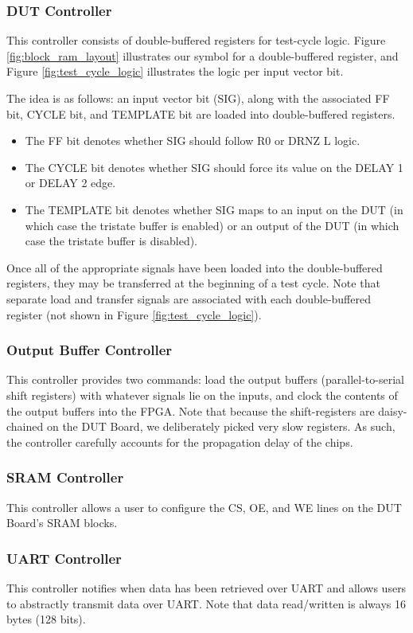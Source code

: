 \subsubsection{DUT Controller}
This controller consists of double-buffered registers for test-cycle logic. Figure \ref{fig:block_ram_layout} illustrates our symbol for a double-buffered register, and Figure \ref{fig:test_cycle_logic} illustrates the logic per input vector bit.

The idea is as follows: an input vector bit (SIG), along with the associated FF bit, CYCLE bit, and TEMPLATE bit are loaded into double-buffered registers. 
\begin{itemize}
\item The FF bit denotes whether SIG should follow R0 or DRNZ L logic.
\item The CYCLE bit denotes whether SIG should force its value on the DELAY 1 or DELAY 2 edge. 
\item The TEMPLATE bit denotes whether SIG maps to an input on the DUT (in which case the tristate buffer is enabled) or an output of the DUT (in which case the tristate buffer is disabled).
\end{itemize}

Once all of the appropriate signals have been loaded into the double-buffered registers, they may be transferred at the beginning of a test cycle. Note that separate load and transfer signals are associated with each double-buffered register (not shown in Figure \ref{fig:test_cycle_logic}). 

\subsubsection{Output Buffer Controller}
This controller provides two commands: load the output buffers (parallel-to-serial shift registers) with whatever signals lie on the inputs, and clock the contents of the output buffers into the FPGA. Note that because the shift-registers are daisy-chained on the DUT Board, we deliberately picked very slow registers. As such, the controller carefully accounts for the propagation delay of the chips.

\subsubsection{SRAM Controller}
This controller allows a user to configure the CS, OE, and WE lines on the DUT Board's SRAM blocks.

\subsubsection{UART Controller}
This controller notifies when data has been retrieved over UART and allows users to abstractly transmit data over UART. Note that data read/written is always 16 bytes (128 bits).

